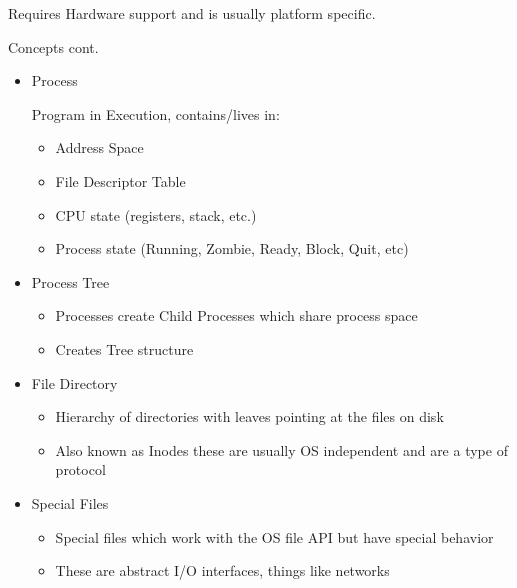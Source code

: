 \documentclass{report}
\begin{document}
\begin{description}
\begin{itemize}
\begin{itemize}
\begin{mdframed}
                            Requires Hardware support and is usually platform specific.
                        \end{mdframed}
                \end{itemize}
        \end{itemize}
    \item Concepts cont.
        \begin{itemize}
            \item Process
                \begin{mdframed}
                    Program in Execution, contains/lives in:
                    \begin{itemize}
                        \item Address Space
                        \item File Descriptor Table
                        \item CPU state (registers, stack, etc.)
                        \item Process state (Running, Zombie, Ready, Block, Quit, etc)
                    \end{itemize}
                \end{mdframed}
            \item Process Tree
                \begin{itemize}
                    \item Processes create Child Processes which share process space
                    \item Creates Tree structure
                \end{itemize}
            \item File Directory
                \begin{itemize}
                    \item Hierarchy of directories with leaves pointing at the files on disk
                    \item Also known as Inodes these are usually OS independent and are a
                        type of protocol
                \end{itemize}
            \item Special Files
                \begin{itemize}
                    \item Special files which work with the OS file API but
                        have special behavior
                    \item These are abstract I/O interfaces, things like networks

\end{itemize}
\end{itemize}
\end{description}
\end{document}
